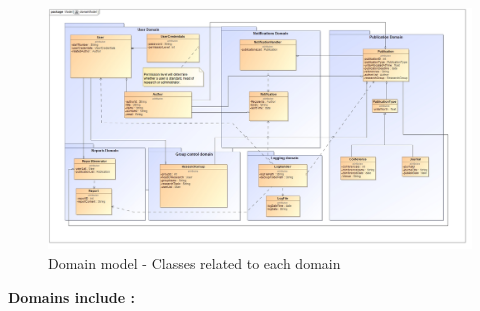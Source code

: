 \documentclass{article}
\begin{document}
			\begin{figure}[H]				
				\includegraphics[width=\linewidth]{../Diagrams/Domain Model/domainModel.jpg}
				\caption{ Domain model - Classes related to each domain }
			\end{figure}
			\begin{center}
			\textbf{Domains include :}
			\end{center}
\end{document}
